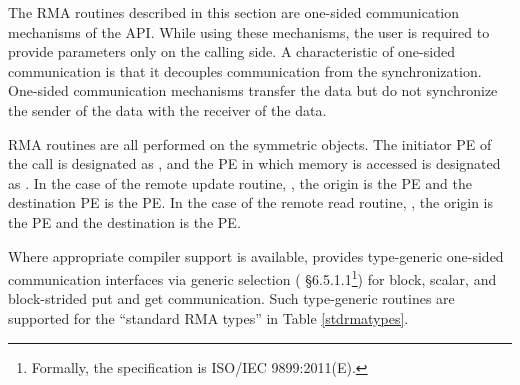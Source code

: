 The \ac{RMA} routines described in this section are one-sided communication
mechanisms of the \openshmem{} \ac{API}. While using these mechanisms, the user
is required to provide parameters only on the calling side. A characteristic of
one-sided communication is that it decouples communication from the
synchronization. One-sided communication mechanisms transfer the data but do not
synchronize the sender of the data with the receiver of the data. 

\openshmem{} \ac{RMA} routines are all performed on the symmetric objects.  The
initiator \ac{PE} of the call is designated as \source{}, and the \ac{PE} in
which memory is accessed is designated as \dest{}. In the case of the remote
update routine, \PUT{}, the origin is the \source{} \ac{PE} and the destination
\ac{PE} is the \dest{} PE. In the case of the remote read routine, \GET{}, the
origin is the \dest{} \ac{PE} and the destination is the \source{} \ac{PE}.

Where appropriate compiler support is available, \openshmem{} provides type-generic 
one-sided communication interfaces via \Celev{} generic selection 
(\Celev{} \S6.5.1.1\footnote{Formally, the \Celev{} specification is ISO/IEC 9899:2011(E).})
for block, scalar, and block-strided put and get communication. 
Such type-generic routines are supported for the
 ``standard \ac{RMA} types''
  in Table \ref{stdrmatypes}.

